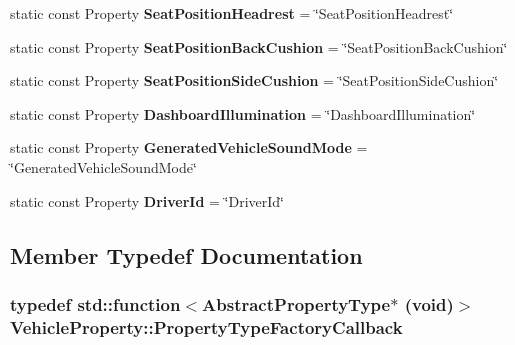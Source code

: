 \begin{DoxyCompactItemize}
\item 
\hypertarget{classVehicleProperty_ad8b62a1dea61b1d37203010ebb95f8cb}{static const Property {\bfseries Seat\-Position\-Headrest} = \char`\"{}Seat\-Position\-Headrest\char`\"{}}\label{classVehicleProperty_ad8b62a1dea61b1d37203010ebb95f8cb}

\item 
\hypertarget{classVehicleProperty_a355f4eaaa3189f081d5ab5bfaada5a0a}{static const Property {\bfseries Seat\-Position\-Back\-Cushion} = \char`\"{}Seat\-Position\-Back\-Cushion\char`\"{}}\label{classVehicleProperty_a355f4eaaa3189f081d5ab5bfaada5a0a}

\item 
\hypertarget{classVehicleProperty_ad6f1eef532c05b0fa36092d934601ed5}{static const Property {\bfseries Seat\-Position\-Side\-Cushion} = \char`\"{}Seat\-Position\-Side\-Cushion\char`\"{}}\label{classVehicleProperty_ad6f1eef532c05b0fa36092d934601ed5}

\item 
\hypertarget{classVehicleProperty_a7d923b6b7a8f3a27e75aa6e8a0aa1057}{static const Property {\bfseries Dashboard\-Illumination} = \char`\"{}Dashboard\-Illumination\char`\"{}}\label{classVehicleProperty_a7d923b6b7a8f3a27e75aa6e8a0aa1057}

\item 
\hypertarget{classVehicleProperty_a213eda302bd74172fda1e408d72079f6}{static const Property {\bfseries Generated\-Vehicle\-Sound\-Mode} = \char`\"{}Generated\-Vehicle\-Sound\-Mode\char`\"{}}\label{classVehicleProperty_a213eda302bd74172fda1e408d72079f6}

\item 
\hypertarget{classVehicleProperty_a5396b973e6511c2cd31b1a7b9f83d69c}{static const Property {\bfseries Driver\-Id} = \char`\"{}Driver\-Id\char`\"{}}\label{classVehicleProperty_a5396b973e6511c2cd31b1a7b9f83d69c}

\end{DoxyCompactItemize}


\subsection{Member Typedef Documentation}
\hypertarget{classVehicleProperty_a6fdd075ce5b867b571020fcdc723ddcf}{
\subsubsection[{Property\-Type\-Factory\-Callback}]{\setlength{\rightskip}{0pt plus 5cm}typedef std\-::function$<${\bf Abstract\-Property\-Type}$\ast$ (void)$>$ {\bf Vehicle\-Property\-::\-Property\-Type\-Factory\-Callback}}}\label{classVehicleProperty_a6fdd075ce5b867b571020fcdc723ddcf}



